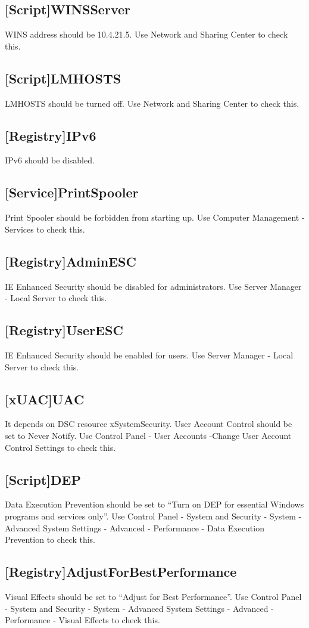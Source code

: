     \subsection{[Script]WINSServer}
      WINS address should be 10.4.21.5. Use Network and Sharing Center to check this.
    \subsection{[Script]LMHOSTS}
      LMHOSTS should be turned off. Use Network and Sharing Center to check this.
    \subsection{[Registry]IPv6}
      IPv6 should be disabled.
    \subsection{[Service]PrintSpooler}
      Print Spooler should be forbidden from starting up. Use Computer Management - Services to check this.
    \subsection{[Registry]AdminESC}
      IE Enhanced Security should be disabled for administrators. Use Server Manager - Local Server to check this.
    \subsection{[Registry]UserESC}
      IE Enhanced Security should be enabled for users. Use Server Manager - Local Server to check this.
    \subsection{[xUAC]UAC}
      It depends on DSC resource xSystemSecurity. User Account Control should be set to Never Notify. Use Control Panel - User Accounts -Change User Account Control Settings to check this.
    \subsection{[Script]DEP}
      Data Execution Prevention should be set to ``Turn on DEP for essential Windows programs and services only''. Use Control Panel - System and Security - System - Advanced System Settings - Advanced - Performance - Data Execution Prevention to check this.
    \subsection{[Registry]AdjustForBestPerformance}
      Visual Effects should be set to ``Adjust for Best Performance''. Use Control Panel - System and Security - System - Advanced System Settings - Advanced - Performance - Visual Effects to check this.

